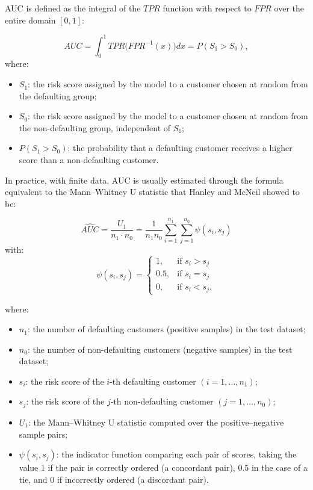 \vspace{1em}
AUC is defined as the integral of the $TPR$ function with respect to $FPR$ over the entire domain $[0,1]$:

\begin{equation}
    AUC = \int_{0}^{1} TPR\big(FPR^{-1}(x)\big) dx = P(S_1 > S_0),
\end{equation}
where:
\begin{itemize}
    \item $S_1$: the risk score assigned by the model to a customer chosen at random from the defaulting group;
    \item $S_0$: the risk score assigned by the model to a customer chosen at random from the non-defaulting group, independent of $S_1$;
    \item $P(S_1 > S_0)$: the probability that a defaulting customer receives a higher score than a non-defaulting customer.
\end{itemize}


\vspace{1em}
In practice, with finite data, AUC is usually estimated through the formula equivalent to the Mann--Whitney U statistic that Hanley and McNeil showed to be:

\begin{equation}
    \widehat{AUC} = \frac{U_1}{n_1 \cdot n_0} = \frac{1}{n_1 n_0}\sum_{i=1}^{n_1}\sum_{j=1}^{n_0} \psi(s_i, s_j)
\end{equation}
with:
\begin{equation}
    \psi(s_i, s_j) = \begin{cases} 1, & \text{if } s_i > s_j \\ 0{.}5, & \text{if } s_i = s_j \\ 0, & \text{if } s_i < s_j, \end{cases}
\end{equation}

\noindent
where:
\begin{itemize}
    \item $n_1$: the number of defaulting customers (positive samples) in the test dataset;
    \item $n_0$: the number of non-defaulting customers (negative samples) in the test dataset;
    \item $s_i$: the risk score of the $i$-th defaulting customer $(i = 1, \dots, n_1)$;
    \item $s_j$: the risk score of the $j$-th non-defaulting customer $(j = 1, \dots, n_0)$;
    \item $U_1$: the Mann--Whitney U statistic computed over the positive--negative sample pairs;
    \item $\psi(s_i, s_j)$: the indicator function comparing each pair of scores, taking the value 1 if the pair is correctly ordered (a concordant pair), 0.5 in the case of a tie, and 0 if incorrectly ordered (a discordant pair).
\end{itemize}

